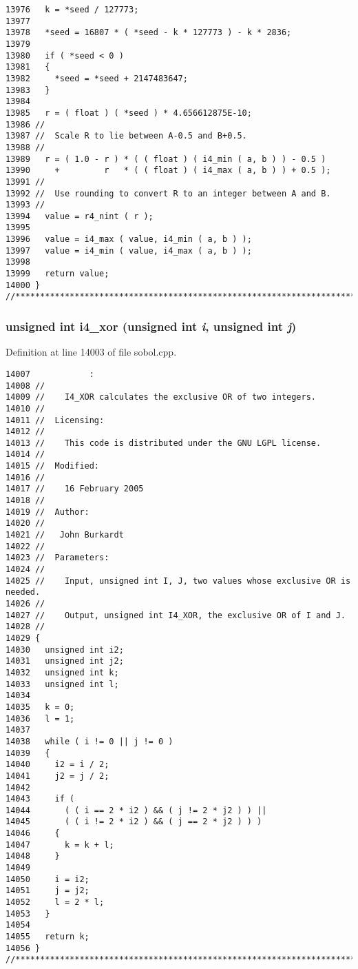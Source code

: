 \begin{Code}
\begin{verbatim}
13976   k = *seed / 127773;
13977 
13978   *seed = 16807 * ( *seed - k * 127773 ) - k * 2836;
13979 
13980   if ( *seed < 0 )
13981   {
13982     *seed = *seed + 2147483647;
13983   }
13984 
13985   r = ( float ) ( *seed ) * 4.656612875E-10;
13986 //
13987 //  Scale R to lie between A-0.5 and B+0.5.
13988 //
13989   r = ( 1.0 - r ) * ( ( float ) ( i4_min ( a, b ) ) - 0.5 ) 
13990     +         r   * ( ( float ) ( i4_max ( a, b ) ) + 0.5 );
13991 //
13992 //  Use rounding to convert R to an integer between A and B.
13993 //
13994   value = r4_nint ( r );
13995 
13996   value = i4_max ( value, i4_min ( a, b ) );
13997   value = i4_min ( value, i4_max ( a, b ) );
13998 
13999   return value;
14000 }
//****************************************************************************80
\end{verbatim}
\end{Code}


\subsubsection{\setlength{\rightskip}{0pt plus 5cm}unsigned int i4\_\-xor (unsigned int {\em i}, unsigned int {\em j})}\label{test_2sobol_8H_47754bd5dbeb5ef03d29ff9ced0f9982}




Definition at line 14003 of file sobol.cpp.

\begin{Code}\begin{verbatim}14007            :
14008 //
14009 //    I4_XOR calculates the exclusive OR of two integers.
14010 //
14011 //  Licensing:
14012 //
14013 //    This code is distributed under the GNU LGPL license. 
14014 //
14015 //  Modified:
14016 //
14017 //    16 February 2005
14018 //
14019 //  Author:
14020 //
14021 //   John Burkardt
14022 //
14023 //  Parameters:
14024 //
14025 //    Input, unsigned int I, J, two values whose exclusive OR is needed.
14026 //
14027 //    Output, unsigned int I4_XOR, the exclusive OR of I and J.
14028 //
14029 {
14030   unsigned int i2;
14031   unsigned int j2;
14032   unsigned int k;
14033   unsigned int l;
14034 
14035   k = 0;
14036   l = 1;
14037 
14038   while ( i != 0 || j != 0 )
14039   {
14040     i2 = i / 2;
14041     j2 = j / 2;
14042 
14043     if ( 
14044       ( ( i == 2 * i2 ) && ( j != 2 * j2 ) ) ||
14045       ( ( i != 2 * i2 ) && ( j == 2 * j2 ) ) )
14046     {
14047       k = k + l;
14048     }
14049 
14050     i = i2;
14051     j = j2;
14052     l = 2 * l;
14053   }
14054 
14055   return k;
14056 }
//****************************************************************************80
\end{verbatim}
\end{Code}


